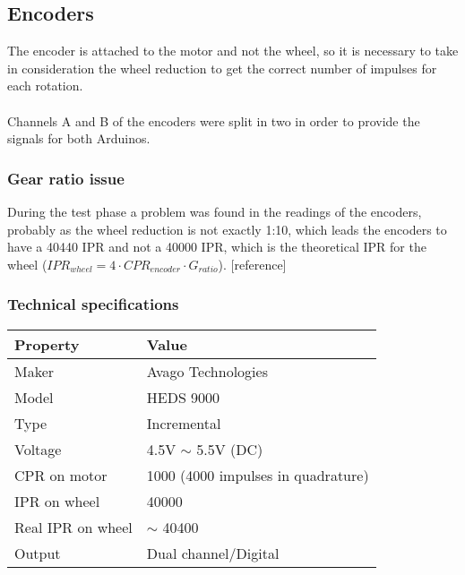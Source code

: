 \subsection{Encoders}
The encoder is attached to the motor and not the wheel, so it is necessary to take in consideration the wheel reduction to get the correct number of impulses for each rotation.
\\ \\
Channels A and B of the encoders were split in two in order to provide the signals for both Arduinos.

\subsubsection{Gear ratio issue}
During the test phase a problem was found in the readings of the encoders, probably as the wheel reduction is not exactly 1:10, 
which leads the encoders to have a 40440 IPR and not a 40000 IPR, which 
is the theoretical IPR for the wheel ($IPR_{wheel} = 4 \cdot CPR_{encoder} \cdot G_{ratio}$). [reference]

\subsubsection{Technical specifications}
\begin{center}
    \begin{table}[h]
        \begin{tabularx}{\textwidth}{|X|X|}
            \hline
            \textbf{Property} &  \textbf{Value} \\
            \hline
            Maker & Avago Technologies \\
            \hline
            Model & HEDS 9000 \\
            \hline
            Type & Incremental \\
            \hline
            Voltage & 4.5V $\sim$ 5.5V (DC) \\
            \hline
            CPR on motor & 1000 (4000 impulses in quadrature) \\
            \hline
            IPR on wheel & 40000 \\
            \hline
            Real IPR on wheel & $\sim$ 40400 \\
            \hline
            Output & Dual channel/Digital \\
            \hline
        \end{tabularx}
    \end{table}
\end{center}

